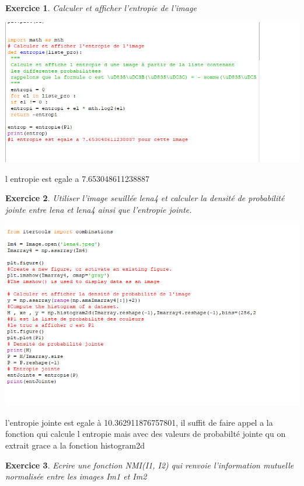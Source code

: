 \documentclass[a4paper,10pt]{scrartcl}
\theoremstyle{plain}
\newtheorem{exo}{Exercice}
\begin{document}
\begin{exo}
Calculer et afficher l'entropie de l'image
\end{exo}

\centerline{\includegraphics[width=18cm]{hi.png}}

l entropie est egale a 7.653048611238887


\begin{exo}
 Utiliser l'image seuillée lena4 et calculer la densité de probabilité jointe entre lena et lena4 ainsi que l'entropie jointe.
\end{exo}

\centerline{\includegraphics[width=18cm]{bnj.png}}
l'entropie jointe est egale à 10.362911876757801, il suffit de faire appel a la fonction qui calcule l entropie mais avec des valeurs de probabilté jointe qu on extrait grace a la fonction histogram2d


\begin{exo}
Ecrire une fonction NMI(I1, I2) qui renvoie l'information mutuelle normalisée entre les images Im1 et Im2
\end{exo}
\end{document}
